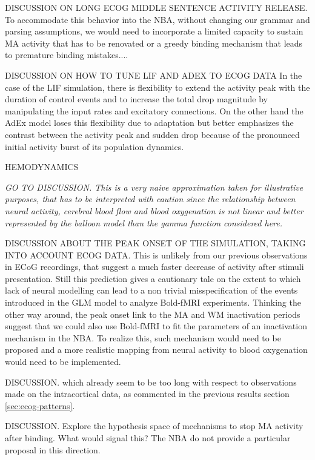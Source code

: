 \documentclass[10pt]{article}
\begin{document}
DISCUSSION ON LONG ECOG MIDDLE SENTENCE ACTIVITY RELEASE. To accommodate this behavior into the NBA, without changing our grammar and parsing assumptions, we would need to incorporate a limited capacity to sustain MA activity that has to be renovated or a greedy binding mechanism that leads to premature binding mistakes....

DISCUSSION ON HOW TO TUNE LIF AND ADEX TO ECOG DATA
In the case of the LIF simulation, there is flexibility to extend the activity peak with the duration of control events and to increase the total drop magnitude by manipulating the input rates and excitatory connections.
On the other hand the AdEx model loses this flexibility due to adaptation but better emphasizes the contrast between the activity peak and sudden drop because of the pronounced initial activity burst of its population dynamics.



HEMODYNAMICS

\emph{GO TO DISCUSSION. This is a very naive approximation taken for illustrative purposes, that has to be interpreted with caution since the relationship between neural activity, cerebral blood flow and blood oxygenation is not linear\cite{Friston_2000,Buxton_2004} and better represented by the balloon model than the gamma function considered here\cite{Waldorp_2009}.}

DISCUSSION ABOUT THE PEAK ONSET OF THE SIMULATION, TAKING INTO ACCOUNT ECOG DATA. This is unlikely from our previous observations in ECoG recordings, that suggest a much faster decrease of activity after stimuli presentation.
Still this prediction gives a cautionary tale on the extent to which lack of neural modelling can lead to a non trivial misspecification of the events introduced in the GLM model to analyze Bold-fMRI experiments.
Thinking the other way around, the peak onset link to the MA and WM inactivation periods suggest that we could also use Bold-fMRI to fit the parameters of an inactivation mechanism in the NBA.
To realize this, such mechanism would need to be proposed and a more realistic mapping from neural activity to blood oxygenation would need to be implemented.

DISCUSSION. which already seem to be too long with respect to observations made on the intracortical data, as commented in the previous results section \ref{sec:ecog-patterns}.

DISCUSSION. Explore the hypothesis space of mechanisms to stop MA activity after binding. What would signal this? The NBA do not provide a particular proposal in this direction.
\end{document}
